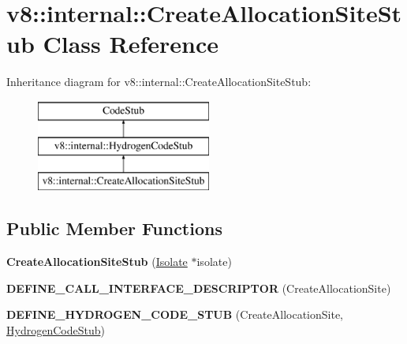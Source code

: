 \hypertarget{classv8_1_1internal_1_1_create_allocation_site_stub}{}\section{v8\+:\+:internal\+:\+:Create\+Allocation\+Site\+Stub Class Reference}
\label{classv8_1_1internal_1_1_create_allocation_site_stub}
Inheritance diagram for v8\+:\+:internal\+:\+:Create\+Allocation\+Site\+Stub\+:\begin{figure}[H]
\begin{center}
\leavevmode
\includegraphics[height=3.000000cm]{classv8_1_1internal_1_1_create_allocation_site_stub}
\end{center}
\end{figure}
\subsection*{Public Member Functions}
\begin{DoxyCompactItemize}
\item 
{\bfseries Create\+Allocation\+Site\+Stub} (\hyperlink{classv8_1_1internal_1_1_isolate}{Isolate} $\ast$isolate)\hypertarget{classv8_1_1internal_1_1_create_allocation_site_stub_a2cac23344adfceefcfd0169163a7f2fc}{}\label{classv8_1_1internal_1_1_create_allocation_site_stub_a2cac23344adfceefcfd0169163a7f2fc}

\item 
{\bfseries D\+E\+F\+I\+N\+E\+\_\+\+C\+A\+L\+L\+\_\+\+I\+N\+T\+E\+R\+F\+A\+C\+E\+\_\+\+D\+E\+S\+C\+R\+I\+P\+T\+OR} (Create\+Allocation\+Site)\hypertarget{classv8_1_1internal_1_1_create_allocation_site_stub_af608aab4ba0c779f93a34362b7131b79}{}\label{classv8_1_1internal_1_1_create_allocation_site_stub_af608aab4ba0c779f93a34362b7131b79}

\item 
{\bfseries D\+E\+F\+I\+N\+E\+\_\+\+H\+Y\+D\+R\+O\+G\+E\+N\+\_\+\+C\+O\+D\+E\+\_\+\+S\+T\+UB} (Create\+Allocation\+Site, \hyperlink{classv8_1_1internal_1_1_hydrogen_code_stub}{Hydrogen\+Code\+Stub})\hypertarget{classv8_1_1internal_1_1_create_allocation_site_stub_a39fae9fd4d4b570e4baee064045be118}{}\label{classv8_1_1internal_1_1_create_allocation_site_stub_a39fae9fd4d4b570e4baee064045be118}

\end{DoxyCompactItemize}
